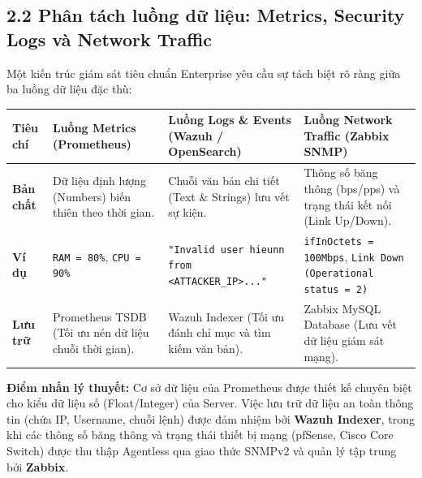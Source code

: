 \documentclass[13pt,a4paper]{extarticle}
\begin{document}
\subsection{2.2 Phân tách luồng dữ liệu: Metrics, Security Logs và Network Traffic}
Một kiến trúc giám sát tiêu chuẩn Enterprise yêu cầu sự tách biệt rõ ràng giữa ba luồng dữ liệu đặc thù:

\begin{table}[H]
    \centering
    \begin{tabularx}{\textwidth}{|X|X|X|X|}
        \hline
        \textbf{Tiêu chí} & \textbf{Luồng Metrics (Prometheus)} & \textbf{Luồng Logs \& Events (Wazuh / OpenSearch)} & \textbf{Luồng Network Traffic (Zabbix SNMP)} \\ \hline
        \textbf{Bản chất} & Dữ liệu định lượng (Numbers) biến thiên theo thời gian. & Chuỗi văn bản chi tiết (Text \& Strings) lưu vết sự kiện. & Thông số băng thông (bps/pps) và trạng thái kết nối (Link Up/Down). \\ \hline
        \textbf{Ví dụ} & \texttt{RAM = 80\%}, \texttt{CPU = 90\%} & \texttt{"Invalid user hieunn from <ATTACKER\_IP>..."} & \texttt{ifInOctets = 100Mbps}, \texttt{Link Down (Operational status = 2)} \\ \hline
        \textbf{Lưu trữ} & Prometheus TSDB (Tối ưu nén dữ liệu chuỗi thời gian). & Wazuh Indexer (Tối ưu đánh chỉ mục và tìm kiếm văn bản). & Zabbix MySQL Database (Lưu vết dữ liệu giám sát mạng). \\ \hline
    \end{tabularx}
\end{table}

\textbf{Điểm nhấn lý thuyết:} Cơ sở dữ liệu của Prometheus được thiết kế chuyên biệt cho kiểu dữ liệu số (Float/Integer) của Server. Việc lưu trữ dữ liệu an toàn thông tin (chứa IP, Username, chuỗi lệnh) được đảm nhiệm bởi \textbf{Wazuh Indexer}, trong khi các thông số băng thông và trạng thái thiết bị mạng (pfSense, Cisco Core Switch) được thu thập Agentless qua giao thức SNMPv2 và quản lý tập trung bởi \textbf{Zabbix}.
\end{document}
